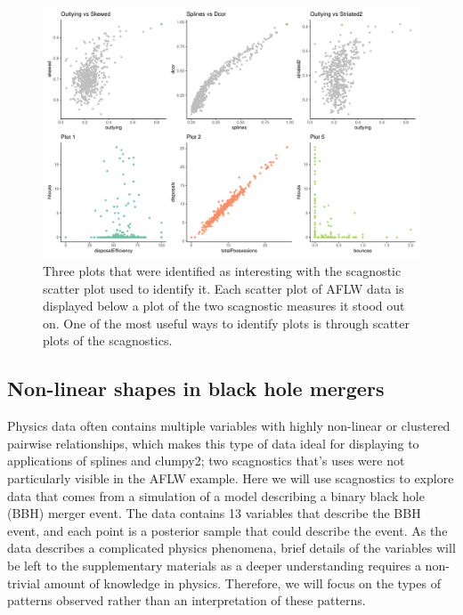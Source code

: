 \begin{Schunk}
\begin{figure}

{\centering \includegraphics[width=1\linewidth]{mason-lee-laa-cook_files/figure-latex/threeplot-static-1} 

}

\caption[Three plots that were identified as interesting with the scagnostic scatter plot used to identify it]{Three plots that were identified as interesting with the scagnostic scatter plot used to identify it. Each scatter plot of AFLW data is displayed below a plot of the two scagnostic measures it stood out on. One of the most useful ways to identify plots is through scatter plots of the scagnostics.}\label{fig:threeplot-static}
\end{figure}
\end{Schunk}

\hypertarget{non-linear-shapes-in-black-hole-mergers}{%
\subsection{Non-linear shapes in black hole
mergers}\label{non-linear-shapes-in-black-hole-mergers}}

Physics data often contains multiple variables with highly non-linear or
clustered pairwise relationships, which makes this type of data ideal
for displaying to applications of splines and clumpy2; two scagnostics
that's uses were not particularly visible in the AFLW example. Here we
will use scagnostics to explore data that comes from a simulation of a
model describing a binary black hole (BBH) merger event. The data
contains 13 variables that describe the BBH event, and each point is a
posterior sample that could describe the event. As the data describes a
complicated physics phenomena, brief details of the variables will be
left to the supplementary materials as a deeper understanding requires a
non-trivial amount of knowledge in physics. Therefore, we will focus on
the types of patterns observed rather than an interpretation of these
patterns.

